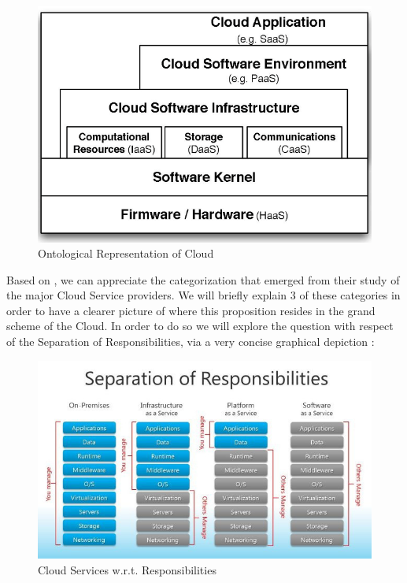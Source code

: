 \documentclass[11pt]{amsart}
\begin{document}
	\begin{center}
		\begin{figure}[h]
			\includegraphics[width=125mm]{c_ontology.png}
			\caption{Ontological Representation of Cloud\label{c_ontology}}
		\end{figure}
	\end{center}
	
	Based on \cite{ontology}, we can appreciate the categorization that emerged from their study of 
	the major Cloud Service providers. We will briefly explain 3 of these categories in order to 
	have a clearer picture of where this proposition resides in the grand scheme of the Cloud. In 
	order to do so we will explore the question with respect of the Separation of Responsibilities, 
	via a very concise graphical depiction \cite{Blewis}:
	
	\begin{center}
		\begin{figure}[h]
			\includegraphics[width=125mm]{cloud_sep_of_resp.jpg}
			\caption{Cloud Services w.r.t. Responsibilities\label{cloud_sep_of_resp}}
		\end{figure}
	\end{center}
	
\end{document}
